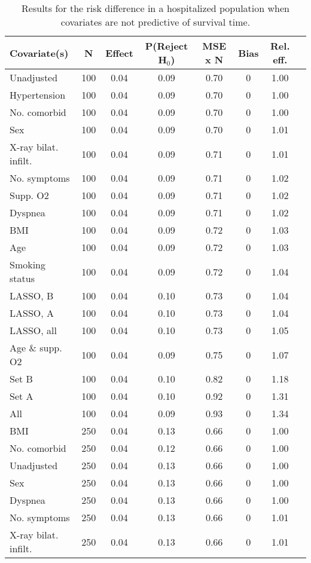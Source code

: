 \documentclass{article}
\begin{document}
{\tabcolsep=6pt  %
\begin{longtable}{lccccccc}
\caption{Results for the risk difference in a hospitalized population when covariates are not predictive of survival time.}\label{tab11}\\
Covariate(s) & N & Effect & P(Reject H$_0$) & MSE x N & Bias & Rel. eff.\\ \midrule
Unadjusted & 100 & 0.04 & 0.09 & 0.70 & 0 & 1.00\\
Hypertension & 100 & 0.04 & 0.09 & 0.70 & 0 & 1.00\\
No. comorbid & 100 & 0.04 & 0.09 & 0.70 & 0 & 1.00\\
Sex & 100 & 0.04 & 0.09 & 0.70 & 0 & 1.01\\
X-ray bilat. infilt. & 100 & 0.04 & 0.09 & 0.71 & 0 & 1.01\\
No. symptoms & 100 & 0.04 & 0.09 & 0.71 & 0 & 1.02\\
Supp. O2 & 100 & 0.04 & 0.09 & 0.71 & 0 & 1.02\\
Dyspnea & 100 & 0.04 & 0.09 & 0.71 & 0 & 1.02\\
BMI & 100 & 0.04 & 0.09 & 0.72 & 0 & 1.03\\
Age & 100 & 0.04 & 0.09 & 0.72 & 0 & 1.03\\
Smoking status & 100 & 0.04 & 0.09 & 0.72 & 0 & 1.04\\
LASSO, B & 100 & 0.04 & 0.10 & 0.73 & 0 & 1.04\\
LASSO, A & 100 & 0.04 & 0.10 & 0.73 & 0 & 1.04\\
LASSO, all & 100 & 0.04 & 0.10 & 0.73 & 0 & 1.05\\
Age \& supp. O2 & 100 & 0.04 & 0.09 & 0.75 & 0 & 1.07\\
Set B & 100 & 0.04 & 0.10 & 0.82 & 0 & 1.18\\
Set A & 100 & 0.04 & 0.10 & 0.92 & 0 & 1.31\\
All & 100 & 0.04 & 0.09 & 0.93 & 0 & 1.34\\ \midrule
BMI & 250 & 0.04 & 0.13 & 0.66 & 0 & 1.00\\
No. comorbid & 250 & 0.04 & 0.12 & 0.66 & 0 & 1.00\\
Unadjusted & 250 & 0.04 & 0.13 & 0.66 & 0 & 1.00\\
Sex & 250 & 0.04 & 0.13 & 0.66 & 0 & 1.00\\
Dyspnea & 250 & 0.04 & 0.13 & 0.66 & 0 & 1.00\\
No. symptoms & 250 & 0.04 & 0.13 & 0.66 & 0 & 1.01\\
X-ray bilat. infilt. & 250 & 0.04 & 0.13 & 0.66 & 0 & 1.01\\

\end{longtable}}
\end{document}
